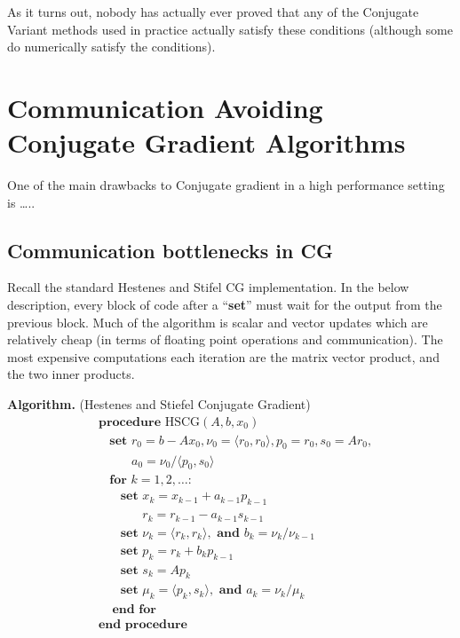 As it turns out, nobody has actually ever proved that any of the
Conjugate Variant methods used in practice actually satisfy these
conditions (although some do numerically satisfy the conditions).

\hypertarget{communication-avoiding-conjugate-gradient-algorithms}{%
\section{Communication Avoiding Conjugate Gradient
Algorithms}\label{communication-avoiding-conjugate-gradient-algorithms}}

One of the main drawbacks to Conjugate gradient in a high performance
setting is \ldots{}..

\hypertarget{communication-bottlenecks-in-cg}{%
\subsection{Communication bottlenecks in
CG}\label{communication-bottlenecks-in-cg}}

Recall the standard Hestenes and Stifel CG implementation. In the below
description, every block of code after a ``\textbf{set}'' must wait for
the output from the previous block. Much of the algorithm is scalar and
vector updates which are relatively cheap (in terms of floating point
operations and communication). The most expensive computations each
iteration are the matrix vector product, and the two inner products.

\textbf{Algorithm.} (Hestenes and Stiefel Conjugate Gradient)
\begin{align*}
&\textbf{procedure}\text{ HSCG}( A,b,x_0 ) 
\\[-.4em]&~~~~\textbf{set } r_0 = b-Ax_0, \nu_0 = \langle r_0,r_0 \rangle, p_0 = r_0, s_0 = Ar_0, 
\\[-.4em]&~~~~\phantom{\textbf{set }}a_0 = \nu_0 / \langle p_0,s_0 \rangle
\\[-.4em]&~~~~\textbf{for } k=1,2,\ldots \textbf{:} 
\\[-.4em]&~~~~~~~~\textbf{set } x_k = x_{k-1} + a_{k-1} p_{k-1} 
\\[-.4em]&~~~~~~~~\phantom{\textbf{set }} r_k = r_{k-1} - a_{k-1} s_{k-1} 
\\[-.4em]&~~~~~~~~\textbf{set } \nu_{k} = \langle r_k,r_k \rangle, \textbf{ and } b_k = \nu_k / \nu_{k-1}
\\[-.4em]&~~~~~~~~\textbf{set }p_k = r_k + b_k p_{k-1}
\\[-.4em]&~~~~~~~~\textbf{set }s_k = A p_k
\\[-.4em]&~~~~~~~~\textbf{set }\mu_k = \langle p_k,s_k \rangle, \textbf{ and } a_k = \nu_k / \mu_k
\\[-.4em]&~~~~~\textbf{end for}
\\[-.4em]&\textbf{end procedure}
\end{align*}

